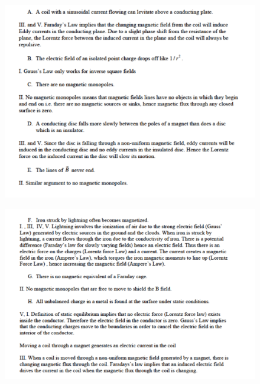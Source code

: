 \documentclass[makesolutionspdf]{esg8022pset}
\begin{document}

\begin{solution}
\begin{figure}[H]
    \centering
    \includegraphics[width = 15cm]{max_gen_sola}
  \end{figure}
  \begin{figure}[H]
    \centering
    \includegraphics[width = 15cm]{max_gen_solb}
  \end{figure}
  \begin{figure}[H]

\end{figure}
\end{solution}
\end{document}
